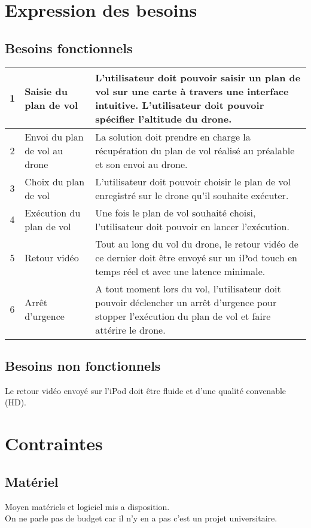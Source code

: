 \documentclass{article}
\begin{document}
\section{Expression des besoins}
	\subsection{Besoins fonctionnels}
	    \begin{center}
        \begin{tabularx}{15cm}{|c|p{4cm}|X|}
            \hline
            1 & Saisie du plan de vol & L'utilisateur doit pouvoir saisir un plan de vol sur une carte à travers une interface intuitive. L'utilisateur doit pouvoir spécifier l'altitude du drone.\\
            \hline
            2 & Envoi du plan de vol au drone & La solution doit prendre en charge la récupération du plan de vol réalisé au préalable et son envoi au drone. \\
            \hline
            3 & Choix du plan de vol  & L'utilisateur doit pouvoir choisir le plan de vol enregistré sur le drone qu'il souhaite exécuter. \\
            \hline
            4 & Exécution du plan de vol  & Une fois le plan de vol souhaité choisi, l'utilisateur doit pouvoir en lancer l'exécution. \\
            \hline
            5 & Retour vidéo  & Tout au long du vol du drone, le retour vidéo de ce dernier doit être envoyé sur un iPod touch en temps réel et avec une latence minimale. \\
            \hline
            6 & Arrêt d'urgence  & A tout moment lors du vol, l'utilisateur doit pouvoir déclencher un arrêt d'urgence pour stopper l'exécution du plan de vol et faire attérire le drone. \\
            \hline
        \end{tabularx}
        \end{center}
	\subsection{Besoins non fonctionnels}
		Le retour vidéo envoyé sur l'iPod doit être fluide et d'une qualité convenable (HD).\\
\section{Contraintes}
	\subsection{Matériel}
		Moyen matériels et logiciel mis a disposition.\\
		On ne parle pas de budget car il n'y en a pas c'est un projet universitaire.\\
\end{document}

